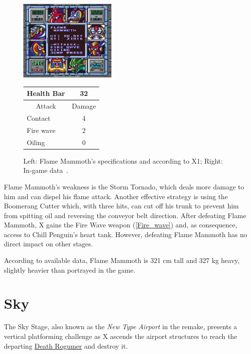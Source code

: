 \begin{figure}[htp]
	\begin{minipage}[c]{0.45\linewidth}
		\vspace{0pt}
		\centering
		\includegraphics[height=4cm]{figures/X1/Flame_mammoth/Flame_mammoth_specs.jpg}
	\end{minipage}
	\begin{minipage}[c]{0.45\linewidth}
		\centering
		\vspace{0pt}
		\begin{tabular}[h]{l c}
			\toprule
			Health Bar & 32\\
			\midrule
			\multicolumn{1}{c}{Attack} & \multicolumn{1}{c}{Damage}\\
			Contact & 4\\
			Fire wave& 2\\
			Oiling & 0\\
			\bottomrule
		\end{tabular}
	\end{minipage}
	\caption{Left: Flame Mammoth's specifications and according to X1; Right: In-game data~\cite{wiki:Flame_mammoth,book:Compendium}. }
	\label{Mammoth_specs}
\end{figure}
Flame Mammoth's weakness is the Storm Tornado, which deals more damage to him and can dispel his flame attack. Another effective strategy is using the Boomerang Cutter which, with three hits, can cut off his trunk to prevent him from spitting oil and reversing the conveyor belt direction. After defeating Flame Mammoth, X gains the Fire Wave weapon (\ref{Fire_wave}) and, as consequence, access to Chill Penguin's heart tank. However, defeating Flame Mammoth has no direct impact on other stages.

According to available data, Flame Mammoth is 321 cm tall and 327 kg heavy, slightly heavier than portrayed in the game.


\section{Sky}
The Sky Stage, also known as the \textit{New Type Airport} in the remake, presents a vertical platforming challenge as X ascends the airport structures to reach the departing \hyperlink{vehicle:Death_Rogumer}{Death Rogumer} and destroy it.

